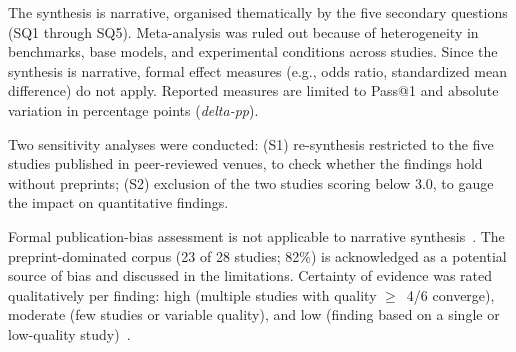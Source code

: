 The synthesis is narrative, organised thematically by the five secondary
questions (SQ1 through SQ5).
Meta-analysis was ruled out because of heterogeneity in benchmarks,
base models, and experimental conditions across studies.
Since the synthesis is narrative, formal effect measures (e.g., odds
ratio, standardized mean difference) do not apply.
Reported measures are limited to Pass@1 and absolute variation in
percentage points (\textit{delta-pp}).

Two sensitivity analyses were conducted:
(S1) re-synthesis restricted to the five studies published in
peer-reviewed venues, to check whether the findings hold without
preprints;
(S2) exclusion of the two studies scoring below 3.0, to gauge the
impact on quantitative findings.

Formal publication-bias assessment is not applicable to narrative
synthesis~\citep{page2021prisma}.
The preprint-dominated corpus (23 of 28 studies; 82\%) is acknowledged
as a potential source of bias and discussed in the limitations.
Certainty of evidence was rated qualitatively per finding:
high (multiple studies with quality $\geq$~4/6 converge),
moderate (few studies or variable quality), and
low (finding based on a single or low-quality
study)~\citep{kitchenham2023segress}.
